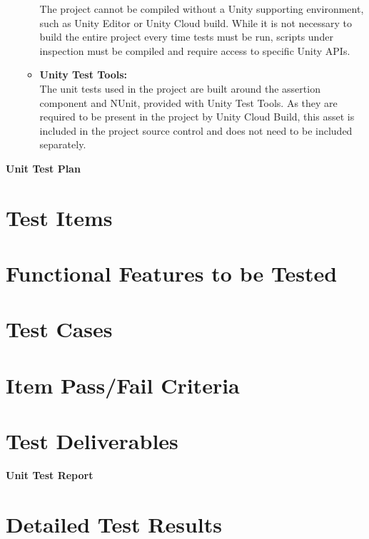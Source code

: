 \documentclass[a4paper,12pt]{article}
\begin{document}
\begin{enumerate}
\begin{itemize}
				The project cannot be compiled without a Unity supporting environment, such as Unity Editor or Unity Cloud build. While it is not necessary to build the entire project every time tests must be run, scripts under inspection must be compiled and require access to specific Unity APIs.
				\item \textbf{Unity Test Tools:}\\
				The unit tests used in the project are built around the assertion component and NUnit, provided with Unity Test Tools. As they are required to be present in the project by Unity Cloud Build, this asset is included in the project source control and does not need to be included separately.
			\end{itemize}
	\end{enumerate}
 \newpage

\begin{center}
	\huge \bfseries Unit Test Plan \\[2cm]
\end{center}

\section{Test Items}

\section{Functional Features to be Tested}

\section{Test Cases}

\section{Item Pass/Fail Criteria}

\section{Test Deliverables}

\newpage

\begin{center}
	\huge \bfseries Unit Test Report \\[2cm]
\end{center}

\section{Detailed Test Results}
\end{document}
